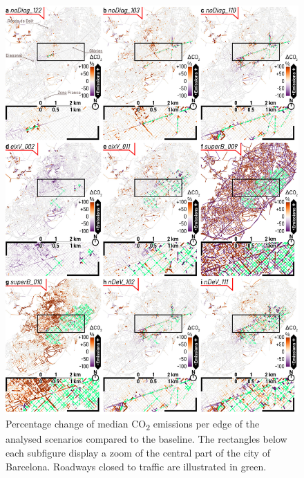 \begin{figure}[htbp!]
    \centering
    \includegraphics[width=1\textwidth]{LCBM_fig_map_05.jpg}
    \captionsetup{font=scriptsize}
    \caption{Percentage change of median CO\textsubscript{2} emissions per edge of the analysed scenarios compared to the baseline. The rectangles below each subfigure display a zoom of the central part of the city of Barcelona. Roadways closed to traffic are illustrated in green.}
   \label{fig:LCBM_fig_map_05}
\end{figure}

% 

